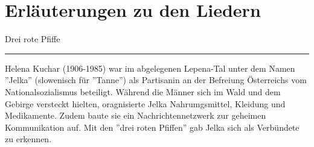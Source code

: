 \section*{Erläuterungen zu den Liedern}

Drei rote Pfiffe\\[-0.5em]
\noindent\rule{\textwidth}{0.5pt}
Helena Kuchar (1906-1985) war im abgelegenen Lepena-Tal unter dem Namen ''Jelka'' (slowenisch für ''Tanne'') als Partisanin an der Befreiung Österreichs vom Nationalsozialismus beteiligt.
Während die Männer sich im Wald und dem Gebirge versteckt hielten, oragnisierte Jelka Nahrumgsmittel, Kleidung und Medikamente.
Zudem baute sie ein Nachrichtennetzwerk zur geheimen Kommunikation auf. Mit den ''drei roten Pfiffen'' gab Jelka sich als Verbündete zu erkennen.


